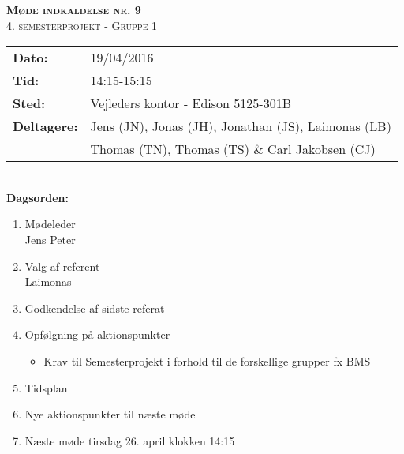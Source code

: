 
\newcommand{\HRule}{\rule{\linewidth}{0.1mm}}


	\begin{center}
		{\huge \bfseries \textsc{Møde indkaldelse nr. 9}}\\
		\textsc{\large 4. semesterprojekt - Gruppe 1}\\[0.3cm]
	\end{center}
	\begin{tabular}{ll}
	\large \textbf{Dato:} & 19/04/2016  \\ %
	\large \textbf{Tid:}  & 14:15-15:15 \\ %
	\large \textbf{Sted:} & Vejleders kontor - Edison 5125-301B		\\ %
	\large \textbf{Deltagere:} & Jens (JN), Jonas (JH), Jonathan (JS), Laimonas (LB) \\
	\large \textbf & Thomas (TN),  Thomas (TS) \& Carl Jakobsen (CJ)\\
	\end{tabular}\\
	\phantom{\,}\hspace{0.1em} \large \textbf{Dagsorden:}
	\begin{enumerate}
		\itemsep 0.3em 
		\item Mødeleder\\
			Jens Peter\\
		\item Valg af referent\\
			Laimonas\\
		\item Godkendelse af sidste referat\\

		\item Opfølgning på aktionspunkter
		\begin{itemize}
			\itemsep 0.3em
			\item Krav til Semesterprojekt i forhold til de forskellige grupper fx BMS\\
		\end{itemize}
		\item Tidsplan\\
		\item Nye aktionspunkter til næste møde\\
		\item Næste møde tirsdag 26. april klokken 14:15
	\end{enumerate}
